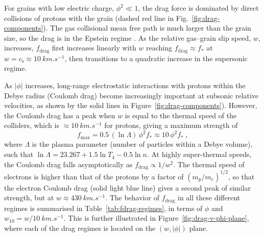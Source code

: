 \message{ !name(dusty-bow-wave.tex)}\documentclass[useAMS, usenatbib, a4paper]{mnras}
\providecommand{\abs}[1]{\lvert#1\rvert}
\newcommand\drag{\ensuremath{_{\text{drag}}}}
\newcommand\sound{\ensuremath{c_{\text{s}}}}
\begin{document}
For grains with low electric charge, \(\phi^2 \ll 1\), the drag force is
dominated by direct collisions of protons with the grain (dashed red
line in Fig.~\ref{fig:drag-components}).  The gas collisional mean
free path is much larger than the grain size, so the drag is in the
Epstein regime \citep{Weidenschilling:1977b}.
As the relative gas--grain slip speed, \(w\), increases, \(f\drag\)
first increases linearly with \(w\) reaching \(f\drag \approx f_*\) at
\(w = \sound \approx \SI{10}{km.s^{-1}}\), then transitions to a quadratic
increase in the supersonic regime.

As \(\abs{\phi}\) increases, long-range electrostatic interactions with
protons within the Debye radius (Coulomb drag) become increasingly
important at subsonic relative velocities, as shown by the solid lines
in Figure~\ref{fig:drag-components}).
However, the Coulomb drag has a peak when \(w\) is equal to the
thermal speed of the colliders, which is
\(\approx \SI{10}{km.s^{-1}}\) for protons, giving a maximum strength of
\begin{equation}
  \label{eq:fdrag-maximum}
  f_{\mathrm{max}} = 0.5\, (\ln\Lambda)\, \phi^2 f_* \approx 10\, \phi^2 f_* \ , 
\end{equation}
where \(\Lambda\) is the plasma parameter (number of particles within a
Debye volume), such that
\(\ln\Lambda = 23.267 + 1.5 \ln T_4 - 0.5 \ln n\).  At highly super-thermal
speeds, the Coulomb drag falls asymptotically as
\(f\drag \propto 1 / w^{2}\).  The thermal speed of electrons is higher than
that of the protons by a factor of \((m_p / m_e)^{1/2}\), so that the
electron Coulomb drag (solid light blue line) gives a second peak of
similar strength, but at \(w \approx \SI{430}{km.s^{-1}}\).  The behavior of
\(f\drag\) in all these different regimes is summarised in
Table~\ref{tab:fdrag-regimes}, in terms of \(\phi\) and
\(w_{10} = w / \SI{10}{km.s^{-1}}\).  This is further illustrated in
Figure~\ref{fig:drag-v-phi-plane}, where each of the drag regimes is
located on the \((w, \abs{\phi})\) plane.
\end{document}
